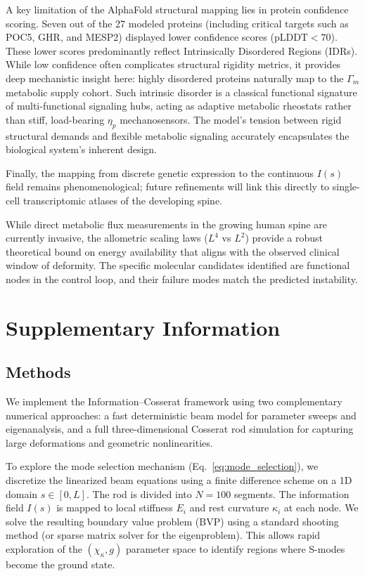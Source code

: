 \documentclass[11pt]{article}
\begin{document}
A key limitation of the AlphaFold structural mapping lies in protein confidence scoring. Seven out of the 27 modeled proteins (including critical targets such as POC5, GHR, and MESP2) displayed lower confidence scores ($\text{pLDDT} < 70$). These lower scores predominantly reflect Intrinsically Disordered Regions (IDRs). While low confidence often complicates structural rigidity metrics, it provides deep mechanistic insight here: highly disordered proteins naturally map to the $\Gamma_m$ metabolic supply cohort. Such intrinsic disorder is a classical functional signature of multi-functional signaling hubs, acting as adaptive metabolic rheostats rather than stiff, load-bearing $\eta_p$ mechanosensors. The model's tension between rigid structural demands and flexible metabolic signaling accurately encapsulates the biological system's inherent design.

Finally, the mapping from discrete genetic expression to the continuous $I(s)$ field remains phenomenological; future refinements will link this directly to single-cell transcriptomic atlases of the developing spine.

While direct metabolic flux measurements in the growing human spine are currently invasive, the allometric scaling laws ($L^4$ vs $L^2$) provide a robust theoretical bound on energy availability that aligns with the observed clinical window of deformity. The specific molecular candidates identified are functional nodes in the control loop, and their failure modes match the predicted instability.




\clearpage
\section*{Supplementary Information}
\subsection*{Methods}
We implement the Information--Cosserat framework using two complementary numerical approaches: a fast deterministic beam model for parameter sweeps and eigenanalysis, and a full three-dimensional Cosserat rod simulation for capturing large deformations and geometric nonlinearities.

To explore the mode selection mechanism (Eq.~\ref{eq:mode_selection}), we discretize the linearized beam equations using a finite difference scheme on a 1D domain $s \in [0, L]$. The rod is divided into $N=100$ segments. The information field $I(s)$ is mapped to local stiffness $E_i$ and rest curvature $\kappa_{i}$ at each node. We solve the resulting boundary value problem (BVP) using a standard shooting method (or sparse matrix solver for the eigenproblem). This allows rapid exploration of the $(\chi_\kappa, g)$ parameter space to identify regions where S-modes become the ground state.
\end{document}
